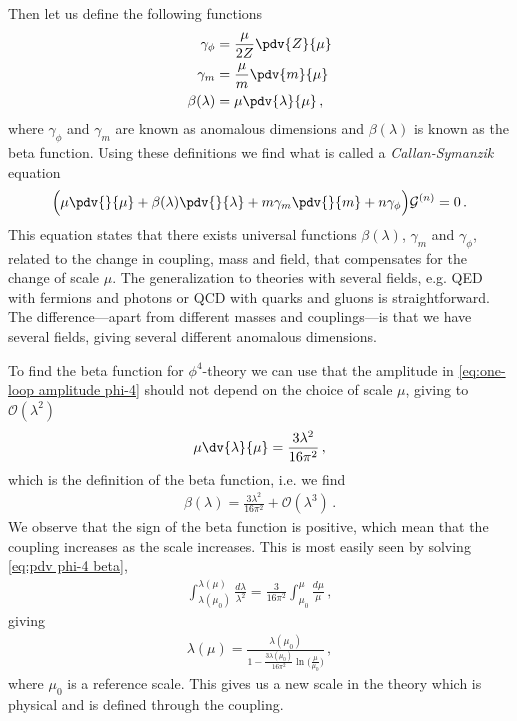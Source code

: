 Then let us define the following functions
\begin{align}
    \gamma_{\phi}&=\frac{\mu}{2Z}\pdv{Z}{\mu}
    \\
    \gamma_{m}&=\frac{\mu}{m}\pdv{m}{\mu}
    \\
    \beta(\lambda)&=\mu\pdv{\lambda}{\mu}\,,
\end{align}
where $\gamma_{\phi}$ and $\gamma_m$ are known as anomalous dimensions and $\beta(\lambda)$ is known as the beta function. Using these definitions we find what is called a \emph{Callan-Symanzik} equation
\begin{align}
    \Big(\mu\pdv{}{\mu}+\beta(\lambda)\pdv{}{\lambda}+m\gamma_{m}\pdv{}{m}+n\gamma_{\phi}\Big)\mathcal{G}^{(n)}=0\,.
\end{align}
This equation states that there exists universal functions $\beta(\lambda)$, $\gamma_m$ and $\gamma_{\phi}$, related to the change in coupling, mass and field, that compensates for the change of scale $\mu$. The generalization to theories with several fields, e.g. QED with fermions and photons or QCD with quarks and gluons is straightforward. The difference---apart from different masses and couplings---is that we have several fields, giving several different anomalous dimensions. 

To find the beta function for $\phi^{4}$-theory we can use that the amplitude in \cref{eq:one-loop amplitude phi-4} should not depend on the choice of scale $\mu$, giving to $\mathcal{O}(\lambda^{2})$
\begin{align}\label{eq:pdv phi-4 beta}
    \mu\dv{\lambda}{\mu}=\frac{3\lambda^{2}}{16\pi^{2}}\,,
\end{align}
which is the definition of the beta function, i.e. we find
\begin{align}
    \beta(\lambda)=\frac{3\lambda^{2}}{16\pi^{2}}+\mathcal{O}(\lambda^{3})\,.
\end{align}
We observe that the sign of the beta function is positive, which mean that the coupling increases as the scale increases. This is most easily seen by solving \cref{eq:pdv phi-4 beta},
\begin{align}
    \int_{\lambda(\mu_{0})}^{\lambda(\mu)}\frac{d\lambda}{\lambda^{2}}=\frac{3}{16\pi^{2}}\int_{\mu_{0}}^{\mu}\frac{d\mu}{\mu}\,,
\end{align}
giving
\begin{align}\label{eq:solution of beta function}
    \lambda(\mu)=\frac{\lambda(\mu_{0})}{1-\frac{3\lambda(\mu_0)}{16\pi^{2}}\ln\big(\frac{\mu}{\mu_{0}}\big)}\,,
\end{align}
where $\mu_{0}$ is a reference scale. This gives us a new scale in the theory which is physical and is defined through the coupling. 


